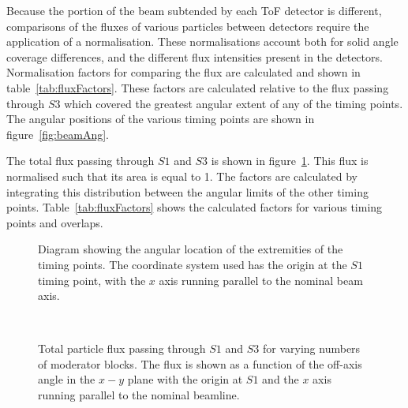 Because the portion of the beam subtended by each ToF detector is different, comparisons of the fluxes of various particles between detectors require the application of a normalisation.
These normalisations account both for solid angle coverage differences, and the different flux intensities present in the detectors.
Normalisation factors for comparing the flux are calculated and shown in table~\ref{tab:fluxFactors}.
These factors are calculated relative to the flux passing through $\mathit{S3}$ which covered the greatest angular extent of any of the timing points. 
The angular positions of the various timing points are shown in figure~\ref{fig:beamAng}.

\begin{figure}[h]
  
\end{figure}

The total flux passing through $\mathit{S1}$ and $\mathit{S3}$ is shown in figure~\ref{fig:s1s3all}.
This flux is normalised such that its area is equal to 1.
The factors are calculated by integrating this distribution between the angular limits of the other timing points.
Table~\ref{tab:fluxFactors} shows the calculated factors for various timing points and overlaps.

\begin{figure}[h]
  \begin{minipage}{0.49\textwidth}
    \begin{adjustbox}{max totalsize={\textwidth}{.5\textheight}}
      
    \end{adjustbox}
    \centering
    \caption{Diagram showing the angular location of the extremities of the timing points. The coordinate system used has the origin at the $\mathit{S1}$ timing point, with the $x$ axis running parallel to the nominal beam axis.}
    \label{fig:beamAng}
  \end{minipage}
  \hfill
  \begin{minipage}{0.49\textwidth}
    \begin{adjustbox}{max totalsize={\textwidth}{0.5\textheight}, center}
      
    \end{adjustbox}
    \caption{Total particle flux passing through $\mathit{S1}$ and $\mathit{S3}$ for varying numbers of moderator blocks. The flux is shown as a function of the off-axis angle in the $x-y$ plane with the origin at $\mathit{S1}$ and the $x$ axis running parallel to the nominal beamline.}
    \label{fig:s1s3all}
  \end{minipage}
  \
\end{figure}

